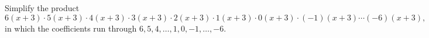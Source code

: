 Simplify the product
\[6(x+3)\cdot5(x+3)\cdot4(x+3)\cdot3(x+3)\cdot2(x+3)\cdot1(x+3)\cdot0(x+3)\cdot(-1)(x+3)\cdots(-6)(x+3),\]
in which the coefficients run through $6,5,4,\dots,1,0,-1,\dots,-6$.
